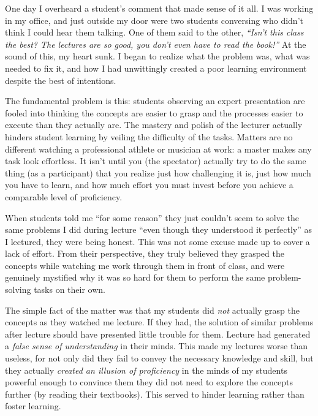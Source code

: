 \vskip 10pt

One day I overheard a student's comment that made sense of it all.  I was working in my office, and just outside my door were two students conversing who didn't think I could hear them talking.  One of them said to the other, \textit{``Isn't this class the best?  The lectures are so good, you don't even have to read the book!''}  At the sound of this, my heart sunk.  I began to realize what the problem was, what was needed to fix it, and how I had unwittingly created a poor learning environment despite the best of intentions.

\vskip 10pt

The fundamental problem is this: students observing an expert presentation are fooled into thinking the concepts are easier to grasp and the processes easier to execute than they actually are.  The mastery and polish of the lecturer actually hinders student learning by veiling the difficulty of the tasks.  Matters are no different watching a professional athlete or musician at work: a master makes any task look effortless.  It isn't until you (the spectator) actually try to do the same thing (as a participant) that you realize just how challenging it is, just how much you have to learn, and how much effort you must invest before you achieve a comparable level of proficiency.

When students told me ``for some reason'' they just couldn't seem to solve the same problems I did during lecture ``even though they understood it perfectly'' as I lectured, they were being honest.  This was not some excuse made up to cover a lack of effort.  From their perspective, they truly believed they grasped the concepts while watching me work through them in front of class, and were genuinely mystified why it was so hard for them to perform the same problem-solving tasks on their own.

The simple fact of the matter was that my students did \textit{not} actually grasp the concepts as they watched me lecture.  If they had, the solution of similar problems after lecture should have presented little trouble for them.  Lecture had generated a \textit{false sense of understanding} in their minds.  This made my lectures worse than useless, for not only did they fail to convey the necessary knowledge and skill, but they actually \textit{created an illusion of proficiency} in the minds of my students powerful enough to convince them they did not need to explore the concepts further (by reading their textbooks).  This served to hinder learning rather than foster learning.  

